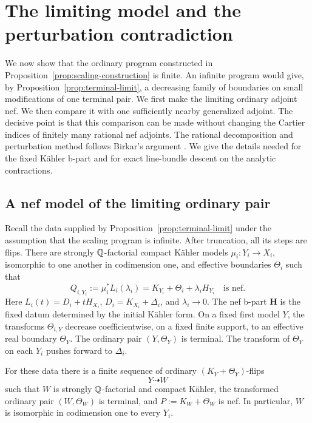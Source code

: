 \section{The limiting model and the perturbation contradiction}
\label{sec:perturbation}

We now show that the ordinary program constructed in
Proposition~\ref{prop:scaling-construction} is finite.  An infinite program
would give, by Proposition~\ref{prop:terminal-limit}, a decreasing family of
boundaries on small modifications of one terminal pair.  We first make the
limiting ordinary adjoint nef.  We then compare it with one sufficiently
nearby generalized adjoint.  The decisive point is that this comparison can
be made without changing the Cartier indices of finitely many rational
nef adjoints.  The rational decomposition and perturbation method follows
Birkar's argument \cite[Remark~3.1, Lemma~3.2, and Section~4]{Birkar2009}.
We give the details needed for the fixed Kähler b-part and for exact
line-bundle descent on the analytic contractions.

\subsection{A nef model of the limiting ordinary pair}

Recall the data supplied by Proposition~\ref{prop:terminal-limit} under the
assumption that the scaling program is infinite.  After truncation, all
its steps are flips.  There are strongly $\mathbb Q$-factorial compact Kähler
models $\mu_i:Y_i\to X_i$, isomorphic to one another in codimension one,
and effective boundaries $\Theta_i$ such that
\begin{equation}
 Q_{i,Y_i}:=\mu_i^*L_i(\lambda_i)
       =K_{Y_i}+\Theta_i+\lambda_i H_{Y_i}
 \quad\text{is nef}.
 \label{eq:extracted-nef}
\end{equation}
Here $L_i(t)=D_i+tH_{X_i}$, $D_i=K_{X_i}+\Delta_i$, and $\lambda_i\to0$.
The nef b-part $\mathbf H$ is the fixed datum determined by the initial
Kähler form.  On a fixed first model $Y$, the transforms $\Theta_{i,Y}$
decrease coefficientwise, on a fixed finite support, to an effective real
boundary $\Theta_Y$.  The ordinary pair $(Y,\Theta_Y)$ is terminal.
The transform of $\Theta_Y$ on each $Y_i$ pushes forward to $\Delta_i$.

\begin{proposition}
\label{prop:limiting-nef}
For these data there is a finite sequence of ordinary
$(K_Y+\Theta_Y)$-flips
\[
 Y\dashrightarrow W
\]
such that $W$ is strongly $\mathbb Q$-factorial and compact Kähler, the transformed
ordinary pair $(W,\Theta_W)$ is terminal, and
$P:=K_W+\Theta_W$ is nef.  In particular, $W$ is isomorphic in codimension
one to every $Y_i$.
\end{proposition}

